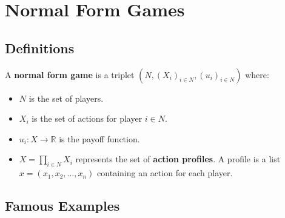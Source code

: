 \begin{itemize}
\begin{center}
\end{center}
\end{itemize}

\section{Normal Form Games}

\subsection{Definitions}
\begin{definition}
A \textbf{normal form game} is a triplet $(N, (X_i)_{i \in N}, (u_i)_{i \in N})$ where:
\begin{itemize}
    \item $N$ is the set of players.
    \item $X_i$ is the set of actions for player $i \in N$.
    \item $u_i: X \rightarrow \mathbb{R}$ is the payoff function.
    \item $X = \prod_{i \in N} X_i$ represents the set of \textbf{action profiles}. A profile is a list $x = (x_1, x_2, \dots, x_n)$ containing an action for each player.
\end{itemize}
\end{definition}

\subsection{Famous Examples}


